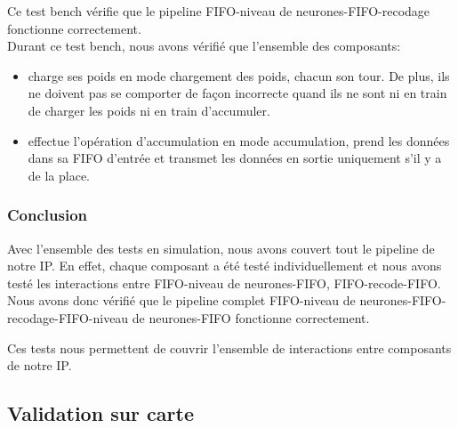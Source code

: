 Ce test bench vérifie que le pipeline FIFO-niveau de neurones-FIFO-recodage
fonctionne correctement.\\

Durant ce test bench, nous avons vérifié que l'ensemble des composants:
\begin{itemize}
	\item charge ses poids en mode chargement des poids, chacun son tour.
	De plus, ils ne doivent pas se comporter de façon incorrecte quand
	ils ne sont ni en train de charger les poids ni en train d'accumuler.
	\item effectue l'opération d'accumulation en mode accumulation, prend
	les données dans sa FIFO d'entrée et transmet les données en sortie
	uniquement s'il y a de la place.
\end{itemize}

\subsubsection{Conclusion}

Avec l'ensemble des tests en simulation, nous avons couvert tout le pipeline de
notre IP. En effet, chaque composant a été testé individuellement et nous avons
testé les interactions entre FIFO-niveau de neurones-FIFO, FIFO-recode-FIFO.
Nous avons donc vérifié que le pipeline complet
FIFO-niveau de neurones-FIFO-recodage-FIFO-niveau de neurones-FIFO fonctionne
correctement.

Ces tests nous permettent de couvrir l'ensemble de interactions entre composants
de notre IP.

\subsection{Validation sur carte}
